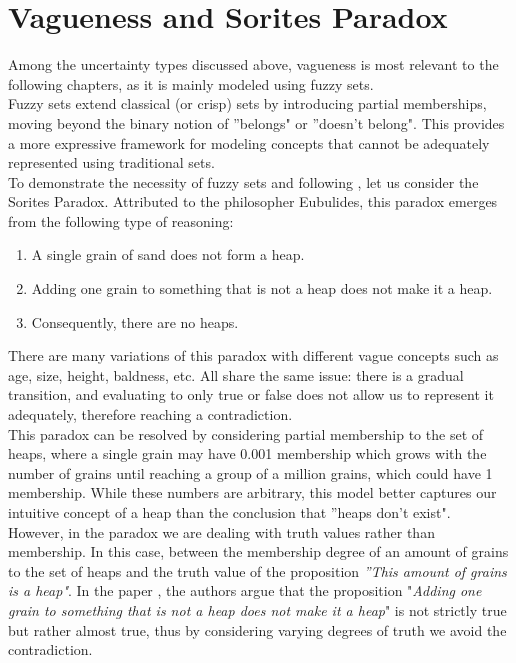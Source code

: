\section{Vagueness and Sorites Paradox}
\label{sec:sorites}

Among the uncertainty types discussed above, vagueness is most relevant to the following chapters, as it is mainly modeled using fuzzy sets.\\

Fuzzy sets extend classical (or crisp) sets by introducing partial memberships, moving beyond the binary notion of ''belongs" or ''doesn't belong". This provides a more expressive framework for modeling concepts that cannot be adequately represented using traditional sets.\\

To demonstrate the necessity of fuzzy sets and following \cite{HájekSorites}, let us consider the Sorites Paradox. Attributed to the philosopher Eubulides, this paradox emerges from the following type of reasoning:

\begin{enumerate}
    \item A single grain of sand does not form a heap.
    \item Adding one grain to something that is not a heap does not make it a heap.
    \item Consequently, there are no heaps.
\end{enumerate}


There are many variations of this paradox with different vague concepts such as age, size, height, baldness, etc. All share the same issue: there is a gradual transition, and evaluating to only true or false does not allow us to represent it adequately, therefore reaching a contradiction.\\

This paradox can be resolved by considering partial membership to the set of heaps, where a single grain may have 0.001 membership which grows with the number of grains until reaching a group of a million grains, which could have 1 membership. While these numbers are arbitrary, this model better captures our intuitive concept of a heap than the conclusion that ''heaps don't exist".\\

However, in the paradox we are dealing with truth values rather than membership. In this case,  between the membership degree of an amount of grains to the set of heaps and the truth value of the proposition \textit{''This amount of grains is a heap"}. In the paper \cite{HájekSorites}, the authors argue that the proposition "\textit{Adding one grain to something that is not a heap does not make it a heap}" is not strictly true but rather almost true, thus by considering varying degrees of truth we avoid the contradiction.\\

